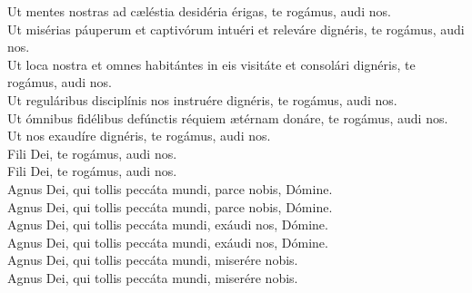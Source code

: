 {	Ut mentes nostras ad cæléstia desidéria érigas, te rogámus, audi nos. \\
		Ut misérias páuperum et captivórum intuéri et releváre dignéris, te rogámus, audi nos. \\
		Ut loca nostra et omnes habitántes in eis visitáte et consolári dignéris, te rogámus, audi nos. \\
		Ut reguláribus disciplínis nos instruére dignéris, te rogámus, audi nos. \\
		Ut ómnibus fidélibus defúnctis réquiem ætérnam donáre, te rogámus, audi nos. \\
	Ut nos exaudíre dignéris, te rogámus, audi nos. \\
	Fili Dei, te rogámus, audi nos. \\
	Fili Dei, te rogámus, audi nos. \\
	Agnus Dei, qui tollis peccáta mundi, parce nobis, Dómine. \\
	Agnus Dei, qui tollis peccáta mundi, parce nobis, Dómine. \\
	Agnus Dei, qui tollis peccáta mundi, exáudi nos, Dómine. \\
	Agnus Dei, qui tollis peccáta mundi, exáudi nos, Dómine. \\
	Agnus Dei, qui tollis peccáta mundi, miserére nobis. \\
	Agnus Dei, qui tollis peccáta mundi, miserére nobis.
}


